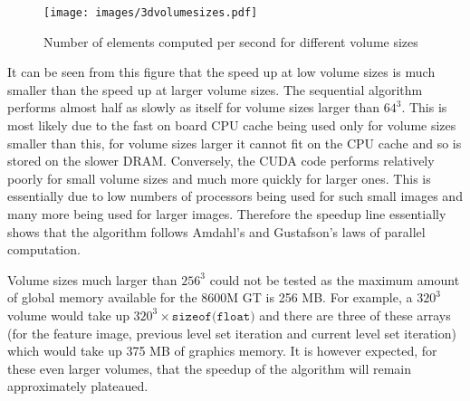 
\begin{figure}
	\centering
		\texttt{[image: images/3dvolumesizes.pdf]}
	\caption{Number of elements computed per second for different volume sizes}
	\label{fig:3dvolumesizes}
\end{figure}


It can be seen from this figure that the speed up at low volume sizes is much smaller than the speed up at larger volume sizes. The sequential algorithm performs almost half as slowly as itself for volume sizes larger than $64^3$. This is most likely due to the fast on board CPU cache being used only for volume sizes smaller than this, for volume sizes larger it cannot fit on the CPU cache and so is stored on the slower DRAM. Conversely, the CUDA code performs relatively poorly for small volume sizes and much more quickly for larger ones. This is essentially due to low numbers of processors being used for such small images and many more being used for larger images. Therefore the speedup line essentially shows that the algorithm follows Amdahl's and Gustafson's laws of parallel computation.

Volume sizes much larger than $256^3$ could not be tested as the maximum amount of global memory available for the 8600M GT is 256 MB. For example, a $320^3$ volume would take up $320^3 \times \texttt{sizeof(float)}$ and there are three of these arrays (for the feature image, previous level set iteration and current level set iteration) which would take up 375 MB of graphics memory. It is however expected, for these even larger volumes, that the speedup of the algorithm will remain approximately plateaued. 

